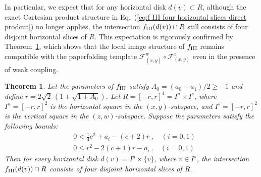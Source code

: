 \documentclass[12pt]{iopart}
\newtheorem{theorem}{Theorem}[section]
\begin{document}
In particular, we expect that for any horizontal disk \( d(v) \subset R \), although the exact Cartesian product structure in Eq.~(\ref{eq:f III four horizontal slices direct prodcut}) no longer applies, the intersection \( f_{\rm III}(d(v)) \cap R \) still consists of four disjoint horizontal slices of \( R \). This expectation is rigorously confirmed by Theorem~\ref{4D Doubly folded horseshoe topology}, which shows that the local image structure of \( f_{\rm III} \) remains compatible with the paperfolding template \( \mathcal{F}^w_{(x,\underline{y})} \circ \mathcal{F}^z_{(\underline{x},y)} \) even in the presence of weak coupling.


\begin{theorem}\label{4D Doubly folded horseshoe topology}
Let the parameters of \( f_{\rm III} \) satisfy \( A_0 = (a_0 + a_1)/2 \geq -1 \) and define \( r = 2\sqrt{2}\,(1 + \sqrt{1 + A_0}) \). Let \( R = [-r, r]^4 = I^u \times I^s \), where \( I^u = [-r, r]^2 \) is the horizontal square in the \( (x,y) \)-subspace, and \( I^s = [-r, r]^2 \) is the vertical square in the \( (z,w) \)-subspace. Suppose the parameters satisfy the following bounds:
\begin{eqnarray}
& 0 < \frac{1}{4}c^2 + a_i - (c+2) r \ , \quad (i = 0, 1) \label{eq:4D_Doubly_folded_horseshoe_topology_parameter_bound_1} \\
& 0 \leq r^2 - 2(c+1) r - a_i \ . \quad (i = 0, 1) \label{eq:4D_Doubly_folded_horseshoe_topology_parameter_bound_2}
\end{eqnarray}
Then for every horizontal disk $d(v)=I^u \times \lbrace v \rbrace$, where $v\in I^s$, the intersection \( f_{{\rm III}}(d(v))\cap R \) consists of four disjoint horizontal slices of \( R \).
\end{theorem}
\end{document}
